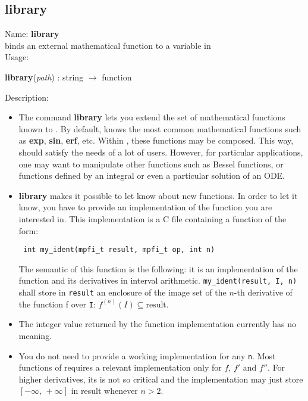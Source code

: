 \subsection{library}
\label{lablibrary}
\noindent Name: \textbf{library}\\
binds an external mathematical function to a variable in \sollya\\
\noindent Usage: 
\begin{center}
\textbf{library}(\emph{path}) : \textsf{string} $\rightarrow$ \textsf{function}\\
\end{center}
\noindent Description: \begin{itemize}

\item The command \textbf{library} lets you extend the set of mathematical
   functions known to \sollya.
   By default, \sollya knows the most common mathematical functions such
   as \textbf{exp}, \textbf{sin}, \textbf{erf}, etc. Within \sollya, these functions may be
   composed. This way, \sollya should satisfy the needs of a lot of
   users. However, for particular applications, one may want to
   manipulate other functions such as Bessel functions, or functions
   defined by an integral or even a particular solution of an ODE.

\item \textbf{library} makes it possible to let \sollya know about new functions. In
   order to let it know, you have to provide an implementation of the
   function you are interested in. This implementation is a C file containing
   a function of the form:
   \begin{verbatim} int my_ident(mpfi_t result, mpfi_t op, int n)\end{verbatim}
   The semantic of this function is the following: it is an implementation of
   the function and its derivatives in interval arithmetic.
   \verb|my_ident(result, I, n)| shall store in \verb|result| an enclosure 
   of the image set of the $n$-th derivative
   of the function f over \verb|I|: $f^{(n)}(I) \subseteq \mathrm{result}$.

\item The integer value returned by the function implementation currently has no meaning.

\item You do not need to provide a working implementation for any \verb|n|. Most functions
   of \sollya requires a relevant implementation only for $f$, $f'$ and $f''$. For higher 
   derivatives, its is not so critical and the implementation may just store 
   $[-\infty,\,+\infty]$ in result whenever $n>2$.


\end{itemize}

